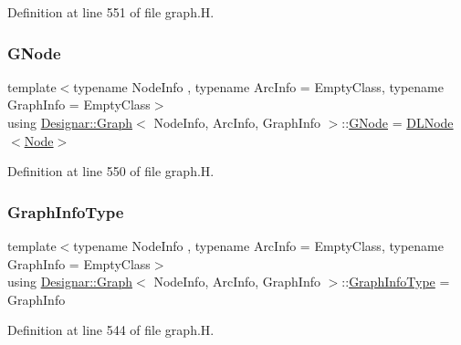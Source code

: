 Definition at line 551 of file graph.\+H.

\mbox{\label{class_designar_1_1_graph_a7e61951db0bb9bfa8a2e317440d4e17f}} 
\subsubsection{\texorpdfstring{G\+Node}{GNode}}
{\footnotesize\ttfamily template$<$typename Node\+Info , typename Arc\+Info  = Empty\+Class, typename Graph\+Info  = Empty\+Class$>$ \\
using \hyperlink{class_designar_1_1_graph}{Designar\+::\+Graph}$<$ Node\+Info, Arc\+Info, Graph\+Info $>$\+::\hyperlink{class_designar_1_1_graph_a7e61951db0bb9bfa8a2e317440d4e17f}{G\+Node} =  \hyperlink{class_designar_1_1_d_l_node}{D\+L\+Node}$<$\hyperlink{class_designar_1_1_graph_a5dfc7dba9d092ac489c72e40390c37d0}{Node}$>$\hspace{0.3cm}{\ttfamily [protected]}}



Definition at line 550 of file graph.\+H.

\mbox{\label{class_designar_1_1_graph_a5b6ad505f3b0f5a5cd288a13bebf2d27}} 
\subsubsection{\texorpdfstring{Graph\+Info\+Type}{GraphInfoType}}
{\footnotesize\ttfamily template$<$typename Node\+Info , typename Arc\+Info  = Empty\+Class, typename Graph\+Info  = Empty\+Class$>$ \\
using \hyperlink{class_designar_1_1_graph}{Designar\+::\+Graph}$<$ Node\+Info, Arc\+Info, Graph\+Info $>$\+::\hyperlink{class_designar_1_1_graph_a5b6ad505f3b0f5a5cd288a13bebf2d27}{Graph\+Info\+Type} =  Graph\+Info}



Definition at line 544 of file graph.\+H.

\mbox{\label{class_designar_1_1_graph_a5dfc7dba9d092ac489c72e40390c37d0}} 
